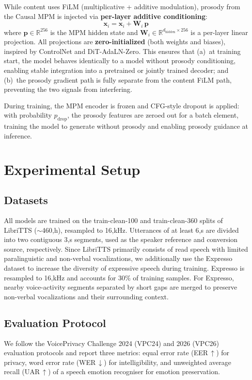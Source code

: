 \documentclass{article}
\begin{document}
While content uses FiLM (multiplicative + additive modulation), prosody from the Causal MPM is injected via \textbf{per-layer additive conditioning}:
\begin{equation}
    \mathbf{x}_i = \mathbf{x}_i + \mathbf{W}_i \, \mathbf{p}
\end{equation}
where $\mathbf{p} \in \mathbb{R}^{256}$ is the MPM hidden state and $\mathbf{W}_i \in \mathbb{R}^{d_\text{hidden} \times 256}$ is a per-layer linear projection.
All projections are \textbf{zero-initialized} (both weights and biases), inspired by ControlNet and DiT-AdaLN-Zero.
This ensures that (a)~at training start, the model behaves identically to a model without prosody conditioning, enabling stable integration into a pretrained or jointly trained decoder; and (b)~the prosody gradient path is fully separate from the content FiLM path, preventing the two signals from interfering.

During training, the MPM encoder is frozen and CFG-style dropout is applied: with probability $p_\text{drop}$, the prosody features are zeroed out for a batch element, training the model to generate without prosody and enabling prosody guidance at inference.

\section{Experimental Setup}
\label{sec:experiments}

\subsection{Datasets}
\label{ssec:dataset}
All models are trained on the train-clean-100 and train-clean-360 splits of LibriTTS ($\sim$460,h), resampled to 16,kHz. 
Utterances of at least 6,s are divided into two contiguous 3,s segments, used as the speaker reference and conversion source, respectively. 
Since LibriTTS primarily consists of read speech with limited paralinguistic and non-verbal vocalizations, we additionally use the Expresso dataset to increase the diversity of expressive speech during training. 
Expresso is resampled to 16,kHz and accounts for 30\% of training samples. 
For Expresso, nearby voice-activity segments separated by short gaps are merged to preserve non-verbal vocalizations and their surrounding context.

\subsection{Evaluation Protocol}
We follow the VoicePrivacy Challenge 2024 (VPC24) and 2026 (VPC26) evaluation protocols and report three metrics: equal error rate (EER\,$\uparrow$) for privacy, word error rate (WER\,$\downarrow$) for intelligibility, and unweighted average recall (UAR\,$\uparrow$) of a speech emotion recogniser for emotion preservation.
\end{document}
